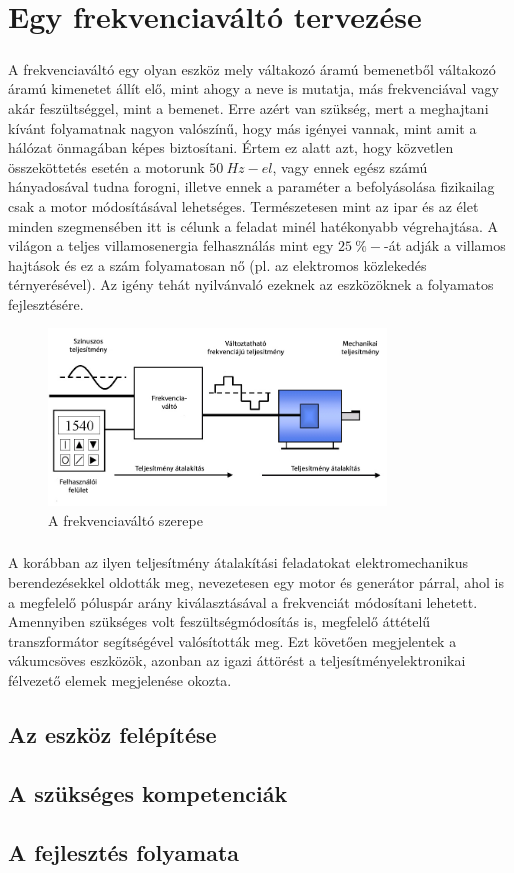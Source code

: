 \chapter{Egy frekvenciaváltó tervezése}

\paragraph{}
A frekvenciaváltó egy olyan eszköz mely váltakozó áramú bemenetből váltakozó áramú kimenetet állít elő, mint ahogy a neve is mutatja, más frekvenciával vagy akár feszültséggel, mint a bemenet. Erre azért van szükség, mert a meghajtani kívánt folyamatnak nagyon valószínű, hogy más igényei vannak, mint amit a hálózat önmagában képes biztosítani. Értem ez alatt azt, hogy közvetlen összeköttetés esetén a motorunk $50\ Hz-el$, vagy ennek egész számú hányadosával tudna forogni, illetve ennek a paraméter a befolyásolása fizikailag csak a motor módosításával lehetséges. Természetesen mint az ipar és az élet minden szegmensében itt is célunk a feladat minél hatékonyabb végrehajtása. A világon a teljes villamosenergia felhasználás mint egy $25\ \%-$-át adják a villamos hajtások és ez a szám folyamatosan nő (pl. az elektromos közlekedés térnyerésével). Az igény tehát nyilvánvaló ezeknek az eszközöknek a folyamatos fejlesztésére.

\begin{figure}[!h]
	\centering
	\includegraphics[width = 0.8\textwidth]{figures/VFD_System.jpg}
	\caption{A frekvenciaváltó szerepe} 
	\label{fig:vfd_system}
\end{figure}

\paragraph{}
A korábban az ilyen teljesítmény átalakítási feladatokat elektromechanikus berendezésekkel oldották meg, nevezetesen egy motor és generátor párral, ahol is a megfelelő póluspár arány kiválasztásával a frekvenciát módosítani lehetett. Amennyiben szükséges volt feszültségmódosítás is, megfelelő áttételű transzformátor segítségével valósították meg. Ezt követően megjelentek a vákumcsöves eszközök, azonban az igazi áttörést a teljesítményelektronikai félvezető elemek megjelenése okozta. 

\section{Az eszköz felépítése}



\section{A szükséges kompetenciák}
\section{A fejlesztés folyamata}
